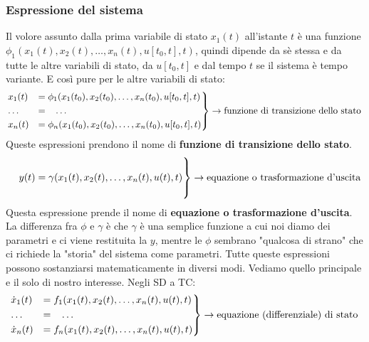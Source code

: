 \subsubsection{Espressione del sistema}
Il volore assunto dalla prima variabile di stato $x_1(t)$ all'istante $t$ è una funzione $\phi_1(x_1(t),x_2(t), \dots, x_n(t), u[t_0,t], t)$, quindi dipende da sè stessa e da tutte le altre variabili di stato, da  $u[t_0,t]$ e dal tempo $t$ se il sistema è tempo variante. E così pure per le altre variabili di stato:
\[
    \begin{rcases}
        x_1(t) &= \phi_1(x_1(t_0),x_2(t_0), \dots, x_n(t_0), u[t_0,t], t)\\
        \dots \;\;\;&= \;\;\;\dots\\
        x_n(t) &= \phi_n(x_1(t_0),x_2(t_0), \dots, x_n(t_0), u[t_0,t], t)
    \end{rcases} \rightarrow \text{funzione di transizione dello stato}\;
\]
Queste espressioni prendono il nome di \textbf{funzione di transizione dello stato}.
\[
    \begin{rcases}
        \\
        \;\;\;\; y(t) = \gamma(x_1(t),x_2(t), \dots, x_n(t), u(t), t)\\
        \\
    \end{rcases} \rightarrow \text{equazione o trasformazione d'uscita}\;
\]
Questa espressione prende il nome di \textbf{equazione o trasformazione d'uscita}.\newline
\newline
La differenza fra $\phi$ e $\gamma$ è che $\gamma$ è una semplice funzione a cui noi diamo dei parametri e ci viene restituita la $y$, mentre le $\phi$ sembrano "qualcosa di strano" che ci richiede la "storia" del sistema come parametri.\newline
\newline
Tutte queste espressioni possono sostanziarsi matematicamente in diversi modi. Vediamo quello principale e il solo di nostro interesse.\newline
\newline
Negli SD a TC:
\[
    \begin{rcases}
        \dot{x}_1(t) &= f_1(x_1(t),x_2(t), \dots, x_n(t), u(t), t)\\
        \dots \;\;\;&= \;\;\;\dots\\
        \dot{x}_n(t) &= f_n(x_1(t),x_2(t), \dots, x_n(t), u(t), t)
    \end{rcases} \rightarrow \text{equazione (differenziale) di stato}\;
\]

